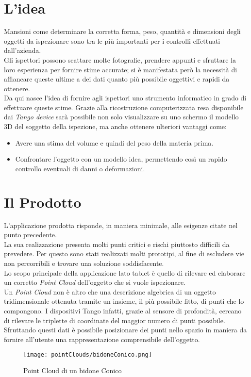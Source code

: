 \section{L'idea}

Mansioni come determinare la corretta forma, peso, quantità e dimensioni degli oggetti da ispezionare sono tra le più importanti per i controlli effettuati dall'azienda.\\
Gli ispettori possono scattare molte fotografie, prendere appunti e sfruttare la loro esperienza per fornire stime accurate; si è manifestata però la necessità di affiancare queste ultime a dei dati quanto più possibile oggettivi e rapidi da ottenere.\\
Da qui nasce l'idea di fornire agli ispettori uno strumento informatico in grado di effettuare queste stime. Grazie alla ricostruzione computerizzata resa disponibile dai \emph{Tango device} sarà possibile non solo visualizzare su uno schermo il modello 3D del soggetto della ispezione, ma anche ottenere ulteriori vantaggi come:
\begin{itemize}
	\item Avere una stima del volume e quindi del peso della materia prima.
	\item Confrontare l'oggetto con un modello idea, permettendo così un rapido controllo eventuali di danni o deformazioni.
\end{itemize}

\section{Il Prodotto}
L'applicazione prodotta risponde, in maniera minimale, alle esigenze citate nel punto precedente.\\
La sua realizzazione presenta molti punti critici e rischi piuttosto difficili da prevedere. Per questo sono stati realizzati molti prototipi, al fine di escludere vie non percorribili e trovare una soluzione soddisfacente.\\
Lo scopo principale della applicazione lato tablet è quello di rilevare ed elaborare un corretto \emph{Point Cloud} dell'oggetto che si vuole ispezionare.\\
Un \emph{Point Cloud} non è altro che una descrizione algebrica di un oggetto tridimensionale ottenuta tramite un insieme, il più possibile fitto, di punti che lo compongono. I dispositivi Tango infatti, grazie al sensore di profondità, cercano di rilevare le triplette di coordinate del maggior numero di punti possibile. Sfruttando questi dati è possibile posizionare dei punti nello spazio in maniera da fornire all'utente una rappresentazione comprensibile dell'oggetto.
\begin{figure}[!h] 
    \centering 
    \texttt{[image: pointClouds/bidoneConico.png]} 
    \caption{Point Cloud di un bidone Conico}
\end{figure}


